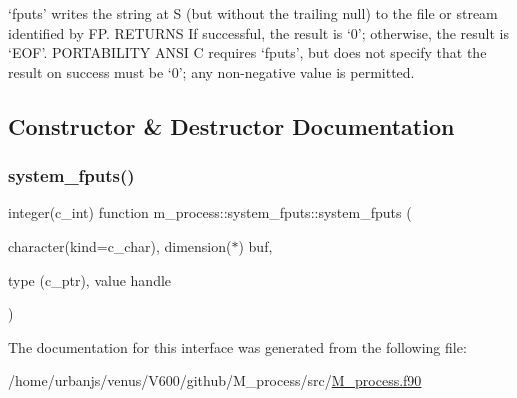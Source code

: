 `fputs' writes the string at S (but without the trailing null) to the file or stream identified by FP. R\+E\+T\+U\+R\+NS If successful, the result is `0'; otherwise, the result is `E\+OF'. P\+O\+R\+T\+A\+B\+I\+L\+I\+TY A\+N\+SI C requires `fputs', but does not specify that the result on success must be `0'; any non-\/negative value is permitted. 

\subsection{Constructor \& Destructor Documentation}
\mbox{\label{interfacem__process_1_1system__fputs_a0a084cac4baf5058a79af7f6490c3a89}} 
\subsubsection{\texorpdfstring{system\+\_\+fputs()}{system\_fputs()}}
{\footnotesize\ttfamily integer(c\+\_\+int) function m\+\_\+process\+::system\+\_\+fputs\+::system\+\_\+fputs (\begin{DoxyParamCaption}\item[{character(kind=c\+\_\+char), dimension($\ast$)}]{buf,  }\item[{type (c\+\_\+ptr), value}]{handle }\end{DoxyParamCaption})\hspace{0.3cm}{\ttfamily [private]}}



The documentation for this interface was generated from the following file\+:\begin{DoxyCompactItemize}
\item 
/home/urbanjs/venus/\+V600/github/\+M\+\_\+process/src/\mbox{\hyperlink{M__process_8f90}{M\+\_\+process.\+f90}}\end{DoxyCompactItemize}
